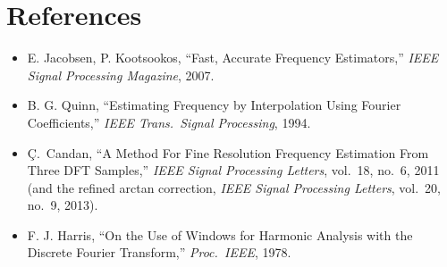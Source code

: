 \documentclass[11pt]{article}
\begin{document}
\section*{References}
\begin{itemize}
  \item E. Jacobsen, P. Kootsookos, ``Fast, Accurate Frequency
        Estimators,'' \emph{IEEE Signal Processing Magazine}, 2007.
  \item B. G. Quinn, ``Estimating Frequency by Interpolation Using
        Fourier Coefficients,'' \emph{IEEE Trans.\ Signal Processing},
        1994.
  \item \c{C}.\ Candan, ``A Method For Fine Resolution Frequency
        Estimation From Three DFT Samples,'' \emph{IEEE Signal
        Processing Letters}, vol.\ 18, no.\ 6, 2011 (and the refined
        arctan correction, \emph{IEEE Signal Processing Letters},
        vol.\ 20, no.\ 9, 2013).
  \item F. J. Harris, ``On the Use of Windows for Harmonic Analysis
        with the Discrete Fourier Transform,'' \emph{Proc.\ IEEE},
        1978.
\end{itemize}
\end{document}
